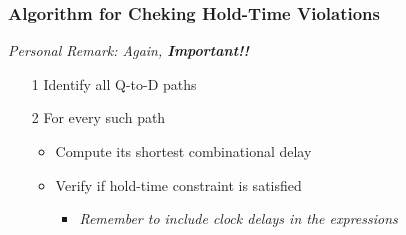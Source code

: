 \documentclass[12pt,openany]{book}
\begin{document}
\subsubsection*{Algorithm for Cheking Hold-Time Violations}
\textit{Personal Remark: Again, \textbf{Important!!}}\newline
\vspace*{-10px}
\begin{itemize}
        \item[1] Identify all Q-to-D paths
        \item[2] For every such path
        \begin{itemize}
            \item Compute its shortest combinational delay
            \item Verify if hold-time constraint is satisfied
            \begin{itemize}
                \item \textit{Remember to include clock delays in the expressions}
            \end{itemize}
        \end{itemize}
\end{itemize}
\end{document}

